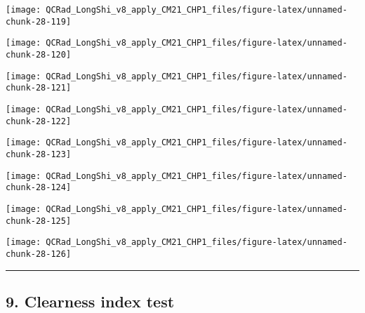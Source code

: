 \documentclass[
  10pt,
  a4paper,oneside]{article}
\begin{document}
\begin{center}\texttt{[image: QCRad\_LongShi\_v8\_apply\_CM21\_CHP1\_files/figure-latex/unnamed-chunk-28-119]} \end{center}

\begin{center}\texttt{[image: QCRad\_LongShi\_v8\_apply\_CM21\_CHP1\_files/figure-latex/unnamed-chunk-28-120]} \end{center}

\begin{center}\texttt{[image: QCRad\_LongShi\_v8\_apply\_CM21\_CHP1\_files/figure-latex/unnamed-chunk-28-121]} \end{center}

\begin{center}\texttt{[image: QCRad\_LongShi\_v8\_apply\_CM21\_CHP1\_files/figure-latex/unnamed-chunk-28-122]} \end{center}

\begin{center}\texttt{[image: QCRad\_LongShi\_v8\_apply\_CM21\_CHP1\_files/figure-latex/unnamed-chunk-28-123]} \end{center}

\begin{center}\texttt{[image: QCRad\_LongShi\_v8\_apply\_CM21\_CHP1\_files/figure-latex/unnamed-chunk-28-124]} \end{center}

\begin{center}\texttt{[image: QCRad\_LongShi\_v8\_apply\_CM21\_CHP1\_files/figure-latex/unnamed-chunk-28-125]} \end{center}

\begin{center}\texttt{[image: QCRad\_LongShi\_v8\_apply\_CM21\_CHP1\_files/figure-latex/unnamed-chunk-28-126]} \end{center}

\begin{center}\rule{0.5\linewidth}{0.5pt}\end{center}

\newpage

\hypertarget{clearness-index-test}{%
\subsection{9. Clearness index test}\label{clearness-index-test}}
\end{document}
